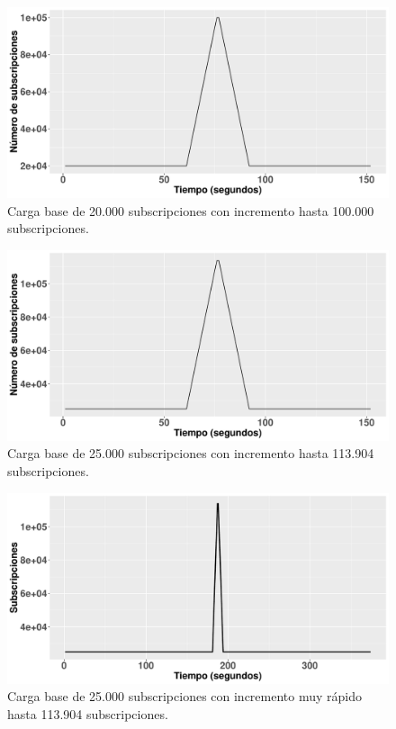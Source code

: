\begin{figure}[htpb]
    \centering
    \includegraphics[width=\textwidth]{images/subs_workload_spike_20k-100k.pdf}
    \caption{Carga base de 20.000 subscripciones con incremento hasta 100.000 subscripciones.}
    \label{fig:subsworkload_20k-100k}
\end{figure}

\begin{figure}[htpb]
    \centering
    \includegraphics[width=\textwidth]{images/subs_workload_spike_25k-113k.pdf}
    \caption{Carga base de 25.000 subscripciones con incremento hasta 113.904 subscripciones.}
    \label{fig:subsworkload_25k-113k}
\end{figure}

\begin{figure}[htpb]
    \centering
    \includegraphics[width=\textwidth]{images/subs_workload_test_spike_fast_25k-113k.pdf}
    \caption{Carga base de 25.000 subscripciones con incremento muy rápido hasta 113.904 subscripciones.}
    \label{fig:subsworkload_fast_spike_25k-113k-100k}
\end{figure}



